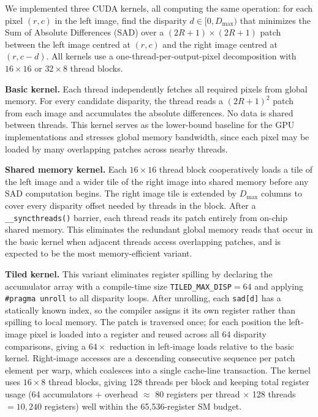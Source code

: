 \documentclass[11pt]{article}
\begin{document}
We implemented three CUDA kernels, all computing the same operation: for each pixel $(r, c)$ in
the left image, find the disparity $d \in [0, D_{\max})$ that minimizes the Sum of Absolute Differences
(SAD) over a $(2R+1) \times (2R+1)$ patch between the left image centred at $(r,c)$ and the right
image centred at $(r, c-d)$. All kernels use a one-thread-per-output-pixel decomposition with
$16 \times 16$ or $32 \times 8$ thread blocks.

\textbf{Basic kernel.} Each thread independently fetches all required pixels from global memory.
For every candidate disparity, the thread reads a $(2R+1)^2$ patch from each image and accumulates
the absolute differences. No data is shared between threads. This kernel serves as the lower-bound
baseline for the GPU implementations and stresses global memory bandwidth, since each pixel
may be loaded by many overlapping patches across nearby threads.

\textbf{Shared memory kernel.} Each $16 \times 16$ thread block cooperatively loads a tile of the left
image and a wider tile of the right image into shared memory before any SAD computation begins.
The right image tile is extended by $D_{\max}$ columns to cover every disparity offset needed by
threads in the block. After a \texttt{\_\_syncthreads()} barrier, each thread reads its patch
entirely from on-chip shared memory. This eliminates the redundant global memory reads that occur
in the basic kernel when adjacent threads access overlapping patches, and is expected to be the
most memory-efficient variant.

\textbf{Tiled kernel.} This variant eliminates register spilling by declaring the accumulator
array with a compile-time size \texttt{TILED\_MAX\_DISP}$= 64$ and applying \texttt{\#pragma unroll}
to all disparity loops. After unrolling, each \texttt{sad[d]} has a statically known index,
so the compiler assigns it its own register rather than spilling to local memory.
The patch is traversed once; for each position the left-image pixel is loaded into a register
and reused across all 64 disparity comparisons, giving a $64\times$ reduction in left-image
loads relative to the basic kernel. Right-image accesses are a descending consecutive sequence
per patch element per warp, which coalesces into a single cache-line transaction.
The kernel uses $16 \times 8$ thread blocks, giving 128 threads per block and keeping
total register usage (64 accumulators $+$ overhead $\approx$ 80 registers per thread $\times$
128 threads $= 10{,}240$ registers) well within the 65{,}536-register SM budget.
\end{document}
